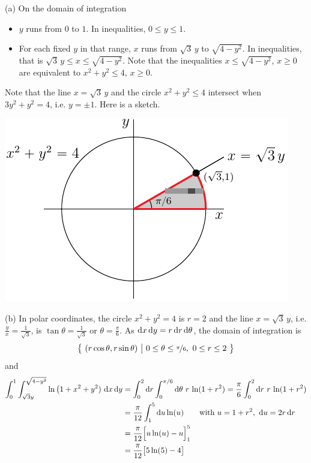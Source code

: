 \begin{solution}
(a) On the domain of integration 
\begin{itemize}
\item
$y$ runs from $0$ to $1$. In inequalities, $0\le y\le 1$.
\item
For each fixed $y$ in that range, $x$ runs from $\sqrt{3}\,y$ to
$\sqrt{4-y^2}$. In inequalities, that is $\sqrt{3}\,y\le x\le \sqrt{4-y^2}$.
Note that the inequalities $x\le \sqrt{4-y^2}$, $x\ge 0$ are equivalent to
$x^2+y^2\le 4$, $x\ge 0$.
\end{itemize}
Note that the line $x=\sqrt{3}\, y$ and the circle $x^2+y^2\le 4$
intersect when $3y^2+y^2=4$, i.e. $y=\pm 1$.
Here is a sketch.

\begin{center}
     \includegraphics{fig/OE13D_5.pdf}
\end{center}

(b)
In polar coordinates, the circle $x^2+y^2= 4$ is $r=2$ and the
line $x=\sqrt{3}\, y$, i.e. $\frac{y}{x} =\frac{1}{\sqrt{3}}$, 
is $\tan\theta=\frac{1}{\sqrt{3}}$ or $\theta=\frac{\pi}{6}$.
As $\mathrm{d}x\,\mathrm{d}y = r\,\mathrm{d}r\,\mathrm{d}\theta$,
the domain of integration is
\begin{align*}
\big\{ \ (r\cos\theta,r\sin\theta)\ \big|\ 0\le \theta\le\nicefrac{\pi}{6},\ 0\le r\le 2\ \big\}
\end{align*}
and
\begin{align*}
\int_0^1 \int_{\sqrt{3}y}^{\sqrt{4-y^2}} \ln\big(1+x^2+y^2)\
                         \mathrm{d}x\,\mathrm{d}y
&= \int_0^2\mathrm{d}r\int_0^{\pi/6}\mathrm{d}\theta\ r\,\ln(1+r^2)
= \frac{\pi}{6}\int_0^2\mathrm{d}r\ r\,\ln(1+r^2) \\
&=\frac{\pi}{12}\int_1^5 \mathrm{d}u \ln(u)
        \qquad\text{with }u=1+r^2,\ \mathrm{d}u=2r\,\mathrm{d}r \\
&=\frac{\pi}{12}\Big[u\ln(u)-u\Big]_1^5 \\
&=\frac{\pi}{12}\big[5\ln(5)-4\big]
\end{align*}
\end{solution}

